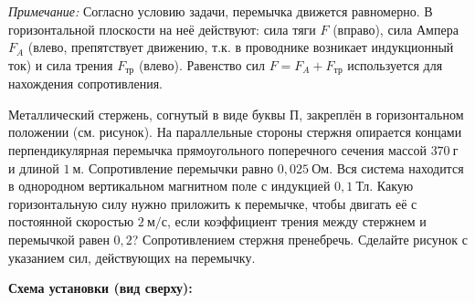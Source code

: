 \noindent \textit{Примечание:} Согласно условию задачи, перемычка движется равномерно. В горизонтальной плоскости на неё действуют: сила тяги \(F\) (вправо), сила Ампера \(F_A\) (влево, препятствует движению, т.к. в проводнике возникает индукционный ток) и сила трения \(F_{\text{тр}}\) (влево). Равенство сил \(F = F_A + F_{\text{тр}}\) используется для нахождения сопротивления.

Металлический стержень, согнутый в виде буквы П, закреплён в горизонтальном положении (см. рисунок). На параллельные стороны стержня опирается концами перпендикулярная перемычка прямоугольного поперечного сечения массой \(370~\text{г}\) и длиной \(1~\text{м}\). Сопротивление перемычки равно \(0{,}025~\text{Ом}\). Вся система находится в однородном вертикальном магнитном поле с индукцией \(0{,}1~\text{Тл}\). Какую горизонтальную силу нужно приложить к перемычке, чтобы двигать её с постоянной скоростью \(2~\text{м/с}\), если коэффициент трения между стержнем и перемычкой равен \(0{,}2\)? Сопротивлением стержня пренебречь. Сделайте рисунок с указанием сил, действующих на перемычку.

\begin{center}
\textbf{Схема установки (вид сверху):}
\end{center}